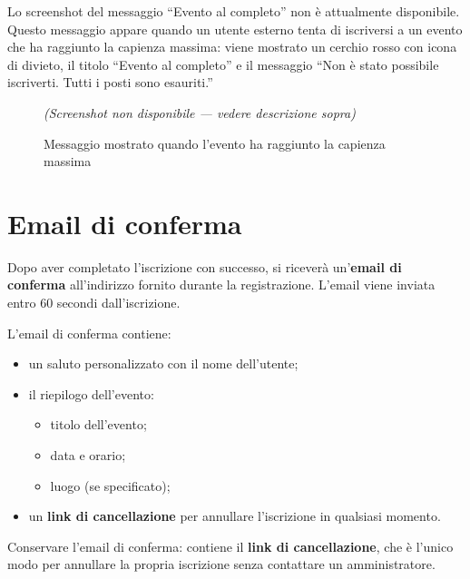 \documentclass[a4paper,11pt,oneside]{book}
\begin{document}
\begin{infobox}
Lo screenshot del messaggio ``Evento al completo'' non \`e attualmente disponibile. Questo messaggio appare quando un utente esterno tenta di iscriversi a un evento che ha raggiunto la capienza massima: viene mostrato un cerchio rosso con icona di divieto, il titolo ``Evento al completo'' e il messaggio ``Non \`e stato possibile iscriverti. Tutti i posti sono esauriti.''
\end{infobox}

\begin{figure}[htbp]
\centering
\textit{(Screenshot non disponibile --- vedere descrizione sopra)}
\caption{Messaggio mostrato quando l'evento ha raggiunto la capienza massima}
\label{fig:event-full-message}
\end{figure}

\section{Email di conferma}
\label{sec:email-conferma-esterno}

Dopo aver completato l'iscrizione con successo, si ricever\`a un'\textbf{email di conferma} all'indirizzo fornito durante la registrazione. L'email viene inviata entro 60 secondi dall'iscrizione.

L'email di conferma contiene:

\begin{itemize}[leftmargin=1.5em]
  \item un saluto personalizzato con il nome dell'utente;
  \item il riepilogo dell'evento:
    \begin{itemize}
      \item titolo dell'evento;
      \item data e orario;
      \item luogo (se specificato);
    \end{itemize}
  \item un \textbf{link di cancellazione} per annullare l'iscrizione in qualsiasi momento.
\end{itemize}

\begin{dangerbox}
Conservare l'email di conferma: contiene il \textbf{link di cancellazione}, che \`e l'unico modo per annullare la propria iscrizione senza contattare un amministratore.
\end{dangerbox}
\end{document}
